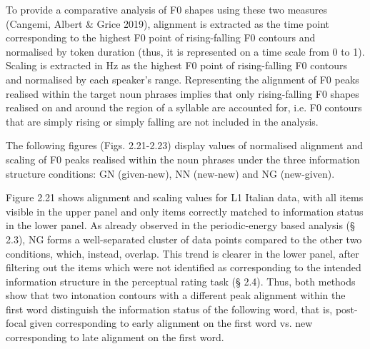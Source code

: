 \begin{styleStandard}
To provide a comparative analysis of F0 shapes using these two measures (Cangemi, Albert \& Grice 2019), alignment is extracted as the time point corresponding to the highest F0 point of rising-falling F0 contours and normalised by token duration (thus, it is represented on a time scale from 0 to 1). Scaling is extracted in Hz as the highest F0 point of rising-falling F0 contours and normalised by each speaker’s range. Representing the alignment of F0 peaks realised within the target noun phrases implies that only rising-falling F0 shapes realised on and around the region of a syllable are accounted for, i.e. F0 contours that are simply rising or simply falling are not included in the analysis.
\end{styleStandard}

\begin{styleStandard}
The following figures (Figs. 2.21-2.23) display values of normalised alignment and scaling of F0 peaks realised within the noun phrases under the three information structure conditions: GN (given-new), NN (new-new) and NG (new-given). 
\end{styleStandard}

\begin{styleStandard}
Figure 2.21 shows alignment and scaling values for L1 Italian data, with all items visible in the upper panel and only items correctly matched to information status in the lower panel. As already observed in the periodic-energy based analysis (§ 2.3), NG forms a well-separated cluster of data points compared to the other two conditions, which, instead, overlap. This trend is clearer in the lower panel, after filtering out the items which were not identified as corresponding to the intended information structure in the perceptual rating task (§ 2.4). Thus, both methods show that two intonation contours with a different peak alignment within the first word distinguish the information status of the following word, that is, post-focal given corresponding to early alignment on the first word vs. new corresponding to late alignment on the first word.
\end{styleStandard}

\begin{stylelsBulletList}
  [Warning: Image ignored] %
 
\end{stylelsBulletList}

